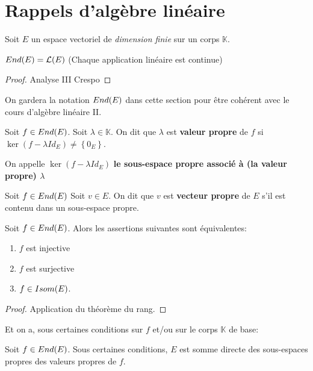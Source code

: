 \section{Rappels d'algèbre linéaire}

Soit $E$ un espace vectoriel de \textit{dimension finie} sur un corps
$\mathbb{K}$.

\begin{proposition}
	$End(E) = \mathcal{L}(E)$
	(Chaque application linéaire est continue)
\end{proposition}

\begin{proof}
	Analyse III Crespo
\end{proof}

On gardera la notation $End(E)$ dans cette section pour être
cohérent avec le cours d'algèbre linéaire II.

\begin{definition}
	\label{def:alg_lin_valeur_propre}
	Soit $f \in End(E)$.
	Soit $\lambda \in \mathbb{K}$.
	On dit que $\lambda$ est \textbf{valeur propre} de $f$ si $\ker(f - \lambda
		Id_{E}) \neq \left\{ 0_{E} \right\}$.

	On appelle $\ker(f - \lambda Id_{E})$ \textbf{le sous-espace propre associé
	à (la valeur propre) $\lambda$}
\end{definition}

\begin{definition}
	\label{def:alg_lin_vecteur_propre}
	Soit $f \in End(E)$
	Soit $v \in E$.
	On dit que $v$ est \textbf{vecteur propre} de $E$ s'il est contenu dans un
	sous-espace propre.
\end{definition}

\begin{proposition}
	Soit $f \in End(E)$.
	Alors les assertions suivantes sont équivalentes:

	\begin{enumerate}
		\item $f$ est injective
		\item $f$ est surjective
		\item $f \in Isom(E)$.
	\end{enumerate}
\end{proposition}

\begin{proof}
	Application du théorème du rang.
\end{proof}

Et on a, sous certaines conditions sur $f$ et/ou sur le corps $\mathbb{K}$ de
base:

\begin{proposition}
	Soit $f \in End(E)$. Sous certaines conditions, $E$ est somme
	directe des sous-espaces propres des valeurs propres de $f$.
\end{proposition}
